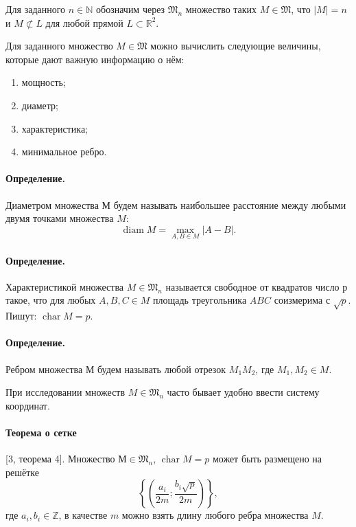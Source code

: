 \documentclass[a4paper,openbib]{article}
\begin{document}
Для заданного $n \in \mathbb{N}$ обозначим через $\mathfrak{M}_{n}$ множество таких $M \in \mathfrak{M}$,
что $|M|=n$ и $M \not \subset L$ для любой прямой $L \subset \mathbb{R}^{2}$.

Для заданного множество $M \in \mathfrak{M}$ можно вычислить следующие величины,
которые дают важную информацию о нём:
\begin{enumerate}
	\item
		мощность;
	\item
		диаметр;
	\item
		характеристика;
	\item
		минимальное ребро.
\end{enumerate}

\paragraph{Определение.}
Диаметром множества М будем называть наибольшее расстояние между любыми двумя точками множества $M$:
$$
	\operatorname{diam} M=\max_{A, B \in M} |A-B|
	.
$$

\paragraph{Определение.}
Характеристикой множества $M \in \mathfrak{M}_{n}$ называется свободное от квадратов число $р$ такое,
что для любых $A, B, C \in M$ площадь треугольника $ABC$ соизмерима с $\sqrt{p}$.
Пишут: $\operatorname{char}{M}={p}$.

\paragraph{Определение.}
Ребром множества $М$ будем называть любой отрезок $M_{1} M_{2}$, где $M_{1}, M_{2} \in M$.


При исследовании множеств $M\in\mathfrak{M}_n$ часто бывает удобно ввести систему координат.


\paragraph{Теорема о сетке} [3, теорема 4].
Множество $М\in\mathfrak{M}_n$, $\operatorname{char} M = p$ может быть размещено на решётке
$$
	\left\{\left(\frac{a_{i}}{2 m} ; \frac{b_{i} \sqrt{p}}{2 m}\right)\right\}
	,
$$
где $a_{i}, b_{i} \in \mathbb{Z}$, в качестве $m$ можно взять длину любого ребра множества $M$.
\end{document}
